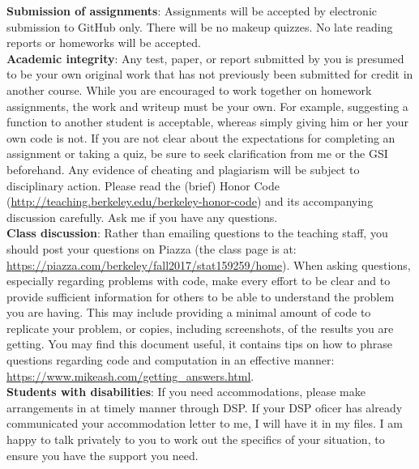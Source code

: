 \documentclass[11pt]{article}
\begin{document}
\textbf{Submission of assignments}: Assignments will be accepted by electronic
submission to GitHub only.  There will be no makeup quizzes. No
late reading reports or homeworks will be accepted. \\ %

\textbf{Academic integrity}: Any test, paper, or report submitted by you is
presumed to be your own original work that has not previously been submitted for
credit in another course. While you are encouraged to work together on homework
assignments, the work and writeup must be your own. For example, suggesting a
function to another student is acceptable, whereas simply giving him or her your
own code is not.  If you are not clear about the expectations for completing an
assignment or taking a quiz, be sure to seek clarification from me or the GSI
beforehand. Any evidence of cheating and plagiarism will be subject to
disciplinary action.  Please read the (brief) Honor Code
(\url{http://teaching.berkeley.edu/berkeley-honor-code}) and its accompanying discussion carefully.  Ask me if you have any questions.\\

\textbf{Class discussion}:
Rather than emailing questions to the teaching staff, you should post
your questions on Piazza (the class page is at:
\url{https://piazza.com/berkeley/fall2017/stat159259/home}).  When asking
questions, especially regarding problems with code, make every effort to be
clear and to provide sufficient information for others to be able to understand
the problem you are having.  This may include providing a minimal amount of code
to replicate your problem, or copies, including screenshots, of the results you
are getting.  You may find this document useful, it contains tips on how to
phrase questions regarding code and computation in an effective manner:
\url{https://www.mikeash.com/getting_answers.html}.\\


\textbf{Students with disabilities}: If you need accommodations, please make
arrangements in at timely manner through DSP. If your DSP oficer has already communicated your accommodation letter to me, I will have it in my files.  I am happy to talk privately to you to work out the specifics of your situation, to ensure you have the support you need.\\
\end{document}
